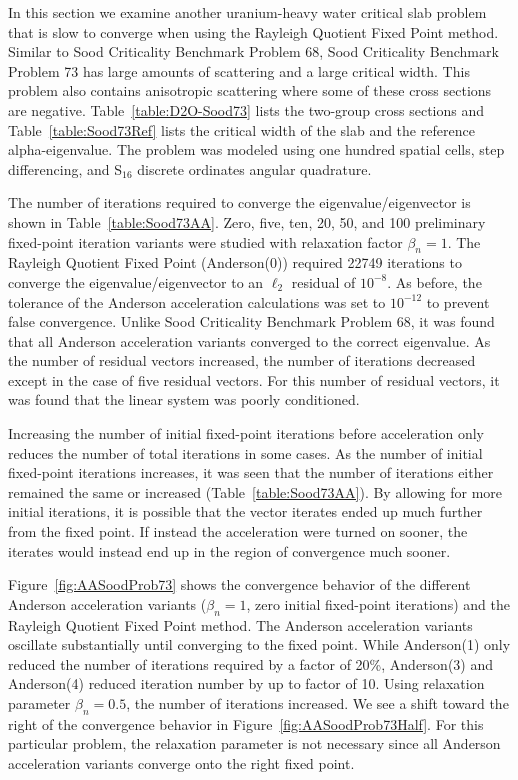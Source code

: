 In this section we examine another uranium-heavy water critical slab problem that is slow to converge when using the Rayleigh Quotient Fixed Point method. Similar to Sood Criticality Benchmark Problem 68, Sood Criticality Benchmark Problem 73 has large amounts of scattering and a large critical width. This problem also contains anisotropic scattering where some of these cross sections are negative. Table~\ref{table:D2O-Sood73} lists the two-group cross sections and Table~\ref{table:Sood73Ref} lists the critical width of the slab and the reference alpha-eigenvalue. The problem was modeled using one hundred spatial cells, step differencing, and S$_{16}$ discrete ordinates angular quadrature.

The number of iterations required to converge the eigenvalue/eigenvector is shown in Table~\ref{table:Sood73AA}. Zero, five, ten, 20, 50, and 100 preliminary fixed-point iteration variants were studied with relaxation factor $\beta_{n} = 1$. The Rayleigh Quotient Fixed Point (Anderson(0)) required 22749 iterations to converge the eigenvalue/eigenvector to an $\ell_{2}$ residual of $10^{-8}$. As before, the tolerance of the Anderson acceleration calculations was set to $10^{-12}$ to prevent false convergence. Unlike Sood Criticality Benchmark Problem 68, it was found that all Anderson acceleration variants converged to the correct eigenvalue. As the number of residual vectors increased, the number of iterations decreased except in the case of five residual vectors. For this number of residual vectors, it was found that the linear system was poorly conditioned.

Increasing the number of initial fixed-point iterations before acceleration only reduces the number of total iterations in some cases. As the number of initial fixed-point iterations increases, it was seen that the number of iterations either remained the same or increased (Table~\ref{table:Sood73AA}). By allowing for more initial iterations, it is possible that the vector iterates ended up much further from the fixed point. If instead the acceleration were turned on sooner, the iterates would instead end up in the region of convergence much sooner.

Figure~\ref{fig:AASoodProb73} shows the convergence behavior of the different Anderson acceleration variants ($\beta_{n} = 1$, zero initial fixed-point iterations) and the Rayleigh Quotient Fixed Point method. The Anderson acceleration variants oscillate substantially until converging to the fixed point. While Anderson(1) only reduced the number of iterations required by a factor of 20\%, Anderson(3) and Anderson(4) reduced iteration number by up to factor of 10. Using relaxation parameter $\beta_{n} = 0.5$, the number of iterations increased. We see a shift toward the right of the convergence behavior in Figure~\ref{fig:AASoodProb73Half}. For this particular problem, the relaxation parameter is not necessary since all Anderson acceleration variants converge onto the right fixed point.

